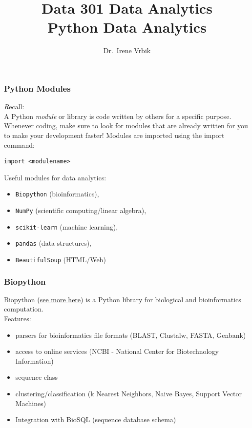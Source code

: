 \documentclass[xcolor=svgnames, handout]{beamer}
\title
  [Data 301 Data Analytics]
  {Data 301 Data Analytics\\
Python Data Analytics}
\author
  [Dr.\ Irene Vrbik]
  {Dr.\ Irene Vrbik}
\date
  {}
\institute
  {University of British Columbia Okanagan \newline irene.vrbik@ubc.ca}
\newcommand{\nl}{\\[1em]}
\newcommand{\ft}[1]{\frametitle{#1}}
\begin{document}
\maketitle





\begin{frame}[fragile]\ft{Python Modules}
{\textit Recall:}\\
A Python \emph{module} or library is code written by others for a specific purpose.  Whenever coding, make sure to look for modules that are already written for you to make your development faster!
Modules are imported using the import command:

\begin{Verbatim}[xleftmargin=.5in] 
import <modulename>
\end{Verbatim}

Useful modules for data analytics:
\begin{itemize}
\item {\tt Biopython} (bioinformatics), 
\item {\tt NumPy} (scientific computing/linear algebra), 
\item {\tt scikit-learn} (machine learning), 
\item {\tt pandas} (data structures), 
\item {\tt BeautifulSoup} (HTML/Web)
\end{itemize}
\end{frame}


\begin{frame}
[fragile]\ft{Biopython}
Biopython (\href{http://biopython.org}{see more here}) is a Python library for biological and bioinformatics computation.\nl

Features:
\begin{itemize}
\item parsers for bioinformatics file formats (BLAST, Clustalw, FASTA, Genbank)
\item access to online services (NCBI - National Center for Biotechnology Information)
\item sequence class
\item clustering/classification (k Nearest Neighbors, Naive Bayes, Support Vector Machines)
\item Integration with BioSQL (sequence database schema)
\end{itemize}
\end{frame}
\end{document}
